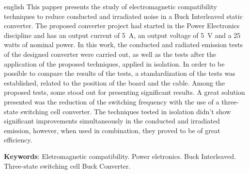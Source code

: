 \documentclass[
	12pt,				%
	openright,			%
	oneside,			%
	a4paper,			%
	chapter=TITLE,		%
	english,			%
	french,				%
	spanish,			%
	brazil				%
	]{abntex2}
\begin{document}
\begin{resumo}[Abstract]
 \begin{otherlanguage*}{english}
    This papper presents the study of electromagnetic compatibility techniques to reduce conducted and irradiated noise in a Buck Interleaved static converter. The proposed converter project had started in the Power Electronics discipline and has an output current of \SI{5}{\ampere}, an output voltage of \SI{5}{\volt} and a 25 watts of nominal power. In this work, the conducted and radiated emission tests of the designed converter were carried out, as well as the tests after the application of the proposed techniques, applied in isolation. In order to be possible to compare the results of the tests, a standardization of the tests was established, related to the position of the board and the cable. Among the proposed tests, some stood out for presenting significant results. A great solution presented was the reduction of the switching frequency with the use of a three-state switching cell converter. The techniques tested in isolation didn't show significant improvements simultaneously in the conducted and irradiated emission, however, when used in combination, they proved to be of great efficiency.

   \vspace{\onelineskip}
 
   \noindent 
   \textbf{Keywords}: Eletromagnetic compatibility. Power eletronics. Buck Interleaved. Three-state switching cell Buck Converter.
 \end{otherlanguage*}
\end{resumo}


\listoffigures*
\cleardoublepage



\imprimirlistadeabreviaturas
\imprimirlistadesimbolos
\cleardoublepage
\end{document}
